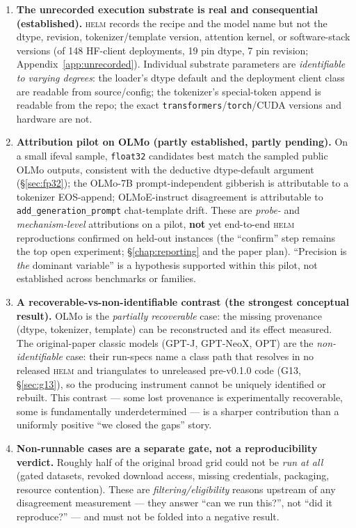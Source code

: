 \documentclass[11pt]{report}
\newcommand{\code}[1]{\texttt{#1}}
\begin{document}
\begin{enumerate}
  \item \textbf{The unrecorded execution substrate is real and consequential
        (established).} \textsc{helm} records the recipe and the model name but not
        the dtype, revision, tokenizer/template version, attention kernel, or
        software-stack versions (of 148 HF-client deployments, 19 pin dtype, 7 pin
        revision; Appendix~\ref{app:unrecorded}). Individual substrate parameters are
        \emph{identifiable to varying degrees}: the loader's dtype default and the
        deployment client class are readable from source/config; the tokenizer's
        special-token append is readable from the repo; the exact
        \code{transformers}/\code{torch}/CUDA versions and hardware are not.
  \item \textbf{Attribution pilot on OLMo (partly established, partly pending).} On a
        small ifeval sample, \code{float32} candidates best match the sampled public
        OLMo outputs, consistent with the deductive dtype-default argument
        (\S\ref{sec:fp32}); the OLMo-7B prompt-independent gibberish is attributable
        to a tokenizer EOS-append; OLMoE-instruct disagreement is attributable to
        \code{add\_generation\_prompt} chat-template drift. These are \emph{probe-} and
        \emph{mechanism-level} attributions on a pilot, \textbf{not} yet end-to-end
        \textsc{helm} reproductions confirmed on held-out instances (the ``confirm''
        step remains the top open experiment; \S\ref{chap:reporting} and the paper
        plan). ``Precision is \emph{the} dominant variable'' is a hypothesis
        supported within this pilot, not established across benchmarks or families.
  \item \textbf{A recoverable-vs-non-identifiable contrast (the strongest conceptual
        result).} OLMo is the \emph{partially recoverable} case: the missing provenance (dtype,
        tokenizer, template) can be reconstructed and its effect measured. The
        original-paper classic models (GPT-J, GPT-NeoX, OPT) are the
        \emph{non-identifiable} case: their run-specs name a class path that resolves
        in no released \textsc{helm} and triangulates to unreleased pre-v0.1.0 code
        (G13, \S\ref{sec:g13}), so the producing instrument cannot be uniquely
        identified or rebuilt. This contrast --- some lost provenance is
        experimentally recoverable, some is fundamentally underdetermined --- is a
        sharper contribution than a uniformly positive ``we closed the gaps'' story.
  \item \textbf{Non-runnable cases are a separate gate, not a reproducibility
        verdict.} Roughly half of the original broad grid could not be \emph{run at
        all} (gated datasets, revoked download access, missing credentials, packaging,
        resource contention). These are \emph{filtering/eligibility} reasons upstream
        of any disagreement measurement --- they answer ``can we run this?'', not
        ``did it reproduce?'' --- and must not be folded into a negative result.
\end{enumerate}
\end{document}

